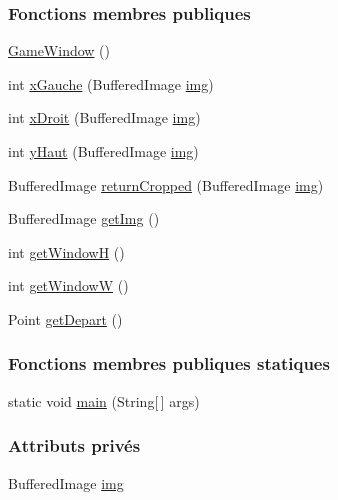 \subsubsection*{Fonctions membres publiques}
\begin{DoxyCompactItemize}
\item 
\hyperlink{classGameWindow_aa10f854e7ec0e407a7bf776f126b4548}{Game\+Window} ()
\item 
int \hyperlink{classGameWindow_ad6e68a8aced99c138d607928bb9aaf82}{x\+Gauche} (Buffered\+Image \hyperlink{classGameWindow_a72d61cef747fc3a4b64d30078c833aed}{img})
\item 
int \hyperlink{classGameWindow_a7acbde7d0be4fb1e3db92f2eacaf5a94}{x\+Droit} (Buffered\+Image \hyperlink{classGameWindow_a72d61cef747fc3a4b64d30078c833aed}{img})
\item 
int \hyperlink{classGameWindow_a23ad629bc54c9a5c10189c881367b5f4}{y\+Haut} (Buffered\+Image \hyperlink{classGameWindow_a72d61cef747fc3a4b64d30078c833aed}{img})
\item 
Buffered\+Image \hyperlink{classGameWindow_ac2ecc4d61e2fb666c891ecd4c9d1cb08}{return\+Cropped} (Buffered\+Image \hyperlink{classGameWindow_a72d61cef747fc3a4b64d30078c833aed}{img})
\item 
Buffered\+Image \hyperlink{classGameWindow_acc4d41cfeb4eab5e593a3929ce654e69}{get\+Img} ()
\item 
int \hyperlink{classGameWindow_a8db0001a1a1974a36ea1e7c22e6a7e35}{get\+Window\+H} ()
\item 
int \hyperlink{classGameWindow_a28f716fe53f24acfe90fb7e4d71ba0a2}{get\+Window\+W} ()
\item 
Point \hyperlink{classGameWindow_aeb8312bfd2899bb35887df607208f972}{get\+Depart} ()
\end{DoxyCompactItemize}
\subsubsection*{Fonctions membres publiques statiques}
\begin{DoxyCompactItemize}
\item 
static void \hyperlink{classGameWindow_ab530b9757613a133cd94dffe4e51b462}{main} (String\mbox{[}$\,$\mbox{]} args)
\end{DoxyCompactItemize}
\subsubsection*{Attributs privés}
\begin{DoxyCompactItemize}
\item 
Buffered\+Image \hyperlink{classGameWindow_a72d61cef747fc3a4b64d30078c833aed}{img}
\end{DoxyCompactItemize}


